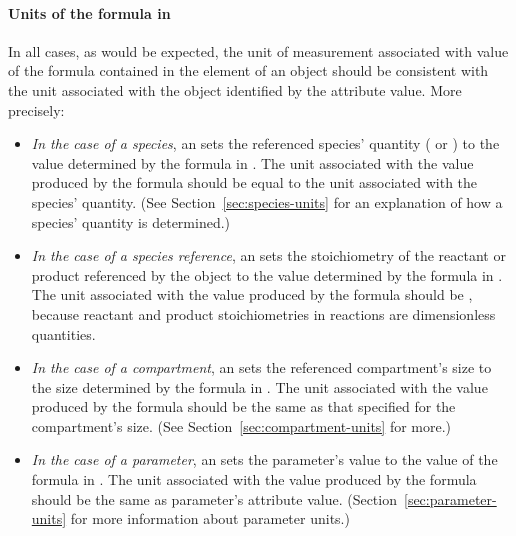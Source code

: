 \paragraph{Units of the  formula in }

In all cases, as would be expected, the unit of measurement
associated with value of the formula contained in the 
element of an \EventAssignment object should be consistent with
the unit associated with the object identified by the
 attribute value.  More precisely:
\begin{itemize}
  
\item \emph{In the case of a species}, an \EventAssignment sets
  the referenced species' quantity ( or
  ) to the value determined by the formula in
  .  The unit associated with the value produced by
  the  formula should be equal to the unit associated
  with the species' quantity.  (See
  Section~\ref{sec:species-units} for an explanation of how a
  species' quantity is determined.)

\item \emph{In the case of a species reference}, an
  \EventAssignment sets the stoichiometry of the reactant or
  product referenced by the \SpeciesReference object to the value
  determined by the formula in .  The unit associated
  with the value produced by the  formula should be
  , because reactant and product
  stoichiometries in reactions are dimensionless quantities.

\item \emph{In the case of a compartment}, an \EventAssignment
  sets the referenced compartment's size to the size determined by
  the formula in .  The unit associated with the value
  produced by the  formula should be the same as that
  specified for the compartment's size.  (See
  Section~\ref{sec:compartment-units} for more.)

\item \emph{In the case of a parameter}, an \EventAssignment sets
  the parameter's value to the value of the formula in
  .  The unit associated with the value produced by
  the  formula should be the same as parameter's
   attribute value.
  (Section~\ref{sec:parameter-units} for more information about
  parameter units.)


\end{itemize}
